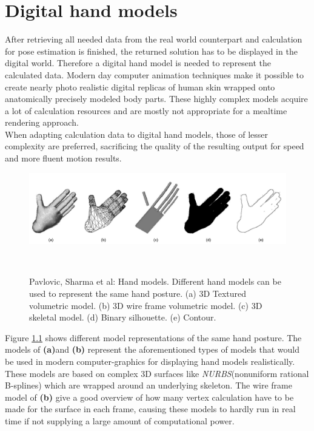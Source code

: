 \chapter{Digital hand models}
After retrieving all needed data from the real world counterpart and calculation for pose estimation is finished, the returned solution has to be displayed in the digital world. Therefore a digital hand model is needed to represent the calculated data. Modern day computer animation techniques make it possible to create nearly photo realistic digital replicas of human skin wrapped onto anatomically precisely modeled body parts. These highly complex models acquire a lot of calculation resources and are mostly not appropriate for a mealtime rendering approach.\\
When adapting calculation data to digital hand models, those of lesser complexity are preferred, sacrificing the quality of the resulting output for speed and more fluent motion results.
\begin{figure}[H]
\includegraphics[width=\textwidth]{images/Pavlovic-Sharmaetal.jpg}
\caption{Pavlovic, Sharma et al: Hand models. Different hand models can be used to represent the same hand posture. (a) 3D Textured volumetric model. (b) 3D wire frame volumetric model. (c) 3D skeletal model. (d) Binary silhouette. (e) Contour.}
~\cite[p.~682]{Pavlovic.1997}
\label{handmodels_detail_level}
\end{figure}
Figure \ref{handmodels_detail_level} shows different model representations of the same hand posture. The models of \textbf{(a)}and \textbf{(b)} represent the aforementioned types of models that would be used in modern computer-graphics for displaying hand models realistically.\\These models are based on complex 3D surfaces like \textit{NURBS}(nonuniform rational B-splines) which are wrapped around an underlying skeleton. The wire frame model of \textbf{(b)} give a good overview of how many vertex calculation have to be made for the surface in each frame, causing these models to hardly run in real time if not supplying a large amount of computational power.\\
